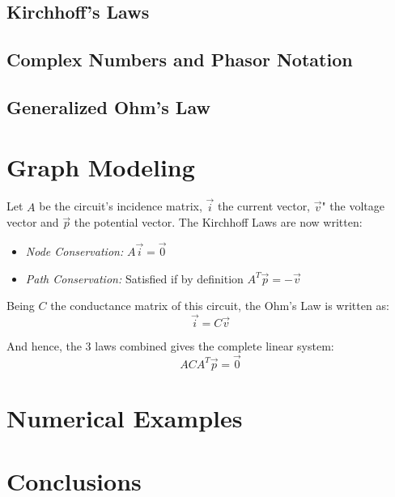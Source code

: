 \documentclass{comjnl}
\begin{document}

\subsection{Kirchhoff's Laws}
\label{Sec:Kirchhoff}


\subsection{Complex Numbers and Phasor Notation}
\label{Sec:Phasors}


\subsection{Generalized Ohm's Law}
\label{Sec:Ohm}



\section{Graph Modeling}
\label{Sec:Graph}
Let $A$ be the circuit's incidence matrix, $\vec{i}$ the current vector, $\vec{v}$" the voltage vector and $\vec{p}$ the potential vector. The Kirchhoff Laws are now written:
\begin{itemize}
\item \emph{Node Conservation:} $A\vec{i} = \vec{0}$
\item \emph{Path Conservation:} Satisfied if by definition $A^T\vec{p}=-\vec{v}$
\end{itemize}

Being $C$ the conductance matrix of this circuit, the Ohm's Law is written as:
$$ \vec{i} = C\vec{v} $$

And hence, the 3 laws combined gives the complete linear system:
$$ ACA^T\vec{p}=\vec{0} $$

\section{Numerical Examples}


\section{Conclusions}
\label{Conclusions}


\nocite{*}



\end{document}
